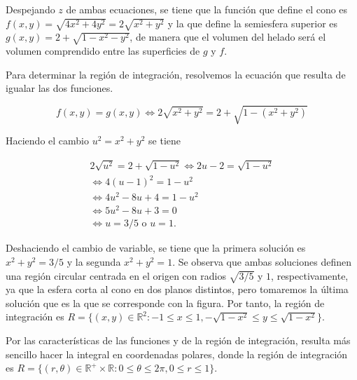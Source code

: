 \documentclass[
  spanish,
  a4paper,
]{scrreport}
\theoremstyle{definition}
\theoremstyle{remark}
\begin{document}
\begin{tcolorbox}[enhanced jigsaw, arc=.35mm, bottomrule=.15mm, bottomtitle=1mm, breakable, colback=white, colbacktitle=quarto-callout-tip-color!10!white, colframe=quarto-callout-tip-color-frame, coltitle=black, left=2mm, leftrule=.75mm, opacityback=0, opacitybacktitle=0.6, rightrule=.15mm, title=\textcolor{quarto-callout-tip-color}{\faLightbulb}\hspace{0.5em}{Solución}, titlerule=0mm, toprule=.15mm, toptitle=1mm]

Despejando \(z\) de ambas ecuaciones, se tiene que la función que define
el cono es \(f(x,y) = \sqrt{4x^2+4y^2} = 2\sqrt{x^2+y^2}\) y la que
define la semiesfera superior es \(g(x,y) = 2 + \sqrt{1-x^2-y^2}\), de
manera que el volumen del helado será el volumen comprendido entre las
superficies de \(g\) y \(f\).

Para determinar la región de integración, resolvemos la ecuación que
resulta de igualar las dos funciones.

\[
f(x,y) = g(x,y) \Leftrightarrow 2\sqrt{x^2+y^2} = 2 + \sqrt{1-(x^2+y^2)}
\]

Haciendo el cambio \(u^2=x^2+y^2\) se tiene

\[
\begin{gathered}
2 \sqrt{u^2} = 2 + \sqrt{1-u^2} 
\Leftrightarrow 2u-2 = \sqrt{1-u^2} \\
\Leftrightarrow 4(u-1)^2 = 1-u^2 \\
\Leftrightarrow 4u^2-8u+4 = 1-u^2 \\
\Leftrightarrow 5u^2-8u+3 = 0 \\
\Leftrightarrow u = 3/5 \mbox{ o } u = 1.
\end{gathered}
\]

Deshaciendo el cambio de variable, se tiene que la primera solución es
\(x^2+y^2=3/5\) y la segunda \(x^2+y^2=1\). Se observa que ambas
soluciones definen una región circular centrada en el origen con radios
\(\sqrt{3/5}\) y \(1\), respectivamente, ya que la esfera corta al cono
en dos planos distintos, pero tomaremos la última solución que es la que
se corresponde con la figura. Por tanto, la región de integración es
\(R=\{(x,y)\in \mathbb{R}^2: -1\leq x\leq 1, -\sqrt{1-x^2}\leq y\leq \sqrt{1-x^2}\}\).

Por las características de las funciones y de la región de integración,
resulta más sencillo hacer la integral en coordenadas polares, donde la
región de integración es
\(R=\{(r,\theta)\in \mathbb{R}^+\times \mathbb{R}: 0\leq \theta\leq 2\pi, 0\leq r\leq 1\}\).


\end{tcolorbox}
\end{document}
